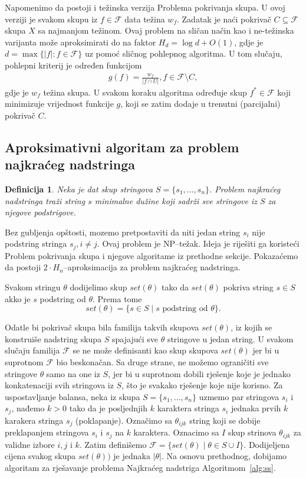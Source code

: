 \documentclass[a4paper, utf8, 11pt, colorlinks]{book}
\newtheorem{definition}{Definicija}[chapter]
\theoremstyle{definition}
\begin{document}
Napomenimo da postoji i težinska verzija Problema pokrivanja skupa. U ovoj verziji je svakom skupu iz $f \in\mathcal{F}$ data težina $w_f$. Zadatak je naći pokrivač $C \subseteq \mathcal{F}$ skupa $X$ sa najmanjom težinom. Ovaj problem na sličan način kao i ne-težinska varijanta može aproksimirati do na faktor $H_d= \log d+O(1)$, gdje je $d= \max\{|f|:f \in \mathcal{F}\}$ uz pomoć sličnog pohlepnog algoritma. U tom slučaju, pohlepni kriterij je određen funkcijom 
\begin{align}
	g(f) = \frac{w_f}{|f \cap U|}, f \in \mathcal{F}\setminus C,
\end{align}
gdje je $w_f$ težina skupa. U svakom koraku algoritma određuje skup $f^* \in \mathcal{F}$ koji minimizuje vrijednost funkcije $g$, koji se zatim dodaje u trenutni (parcijalni) pokrivač $C$.

\subsection{Aproksimativni algoritam za problem najkraćeg nadstringa}


\begin{definition}
   Neka je dat skup stringova $S=\{s_1,...,s_n\}$. Problem najkraćeg nadstringa traži string  $s$ minimalne dužine koji sadrži sve stringove iz $S$ za njegove podstrigove. 
  \end{definition}
Bez gubljenja opštosti, mozemo pretpostaviti da niti jedan string $s_i$ nije podstring stringa $s_j, i\neq j$.
Ovaj problem je NP--težak. Ideja je riješiti ga koristeći Problem pokrivanja skupa i 
njegove algoritame iz prethodne sekcije. Pokazaćemo da postoji $2\cdot H_n$--aproksimacija za problem najkraćeg nadstringa. 

 Svakom stringu $\theta$ dodijelimo skup $set(\theta)$ tako da   $set(\theta)$ pokriva string $s\in S$ akko 
je $s$ podstring od $\theta$. Prema tome 
$$set(\theta) = \{ s \in S \mid s \mbox{  podstring od }\theta \}.$$

 Odatle bi pokrivač skupa bila familija takvih skupova $set(\theta)$, iz kojih se konstruiše nadstring skupa $S$ spajajući sve $\theta$ stringove u jedan string. U svakom slučaju familija  $\mathcal{F}$ se ne može definisanti kao skup skupova $set(\theta)$ jer bi u suprotnom $\mathcal{F}$ bio beskonačan. Sa druge strane, ne možemo ograničiti sve stringove $\theta$ samo na one iz $S$, jer bi u suprotnom dobili rješenje koje je jednako konkatenaciji svih stringova iz $S$, što je svakako  rješenje koje nije korisno. Za uspostavljanje balansa, neka iz skupa $S=\{s_1,...,s_n\}$ uzmemo par stringova $s_i$ i $s_j$, nađemo $k>0$  tako da je posljednjih $k$ karaktera stringa $s_i$ jednaka prvih $k$ karakera stringa $s_j$ (poklapanje). Označimo sa $\theta_{ijk}$ string koji se 
dobije preklapanjem stringova $s_i$ i $s_j$ na $k$ karaktera. Oznacimo sa $I$ skup strinova $\theta_{ijk}$  za validne izbore $i,j$ i $k$. Zatim definišemo $\mathcal{F}=\{set(\theta) \mid  \theta \in S \cup I\}$. Dodijeljena cijena svakog skupa $set(\theta))$ je jednaka $|\theta|$. Na osnovu prethodnog, dobijamo algoritam za rješavanje problema Najkraćeg nadstriga Algoritmom~\ref{alg:ss}. 
\end{document}
